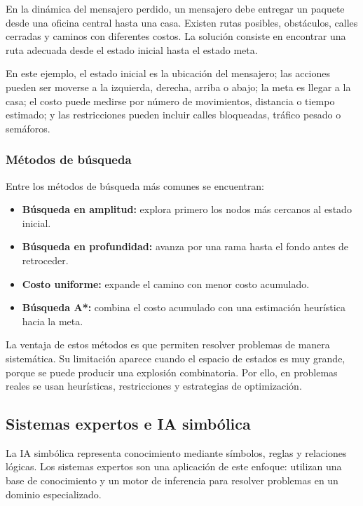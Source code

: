 En la dinámica del mensajero perdido, un mensajero debe entregar un paquete desde una oficina central hasta una casa. Existen rutas posibles, obstáculos, calles cerradas y caminos con diferentes costos. La solución consiste en encontrar una ruta adecuada desde el estado inicial hasta el estado meta.

En este ejemplo, el estado inicial es la ubicación del mensajero; las acciones pueden ser moverse a la izquierda, derecha, arriba o abajo; la meta es llegar a la casa; el costo puede medirse por número de movimientos, distancia o tiempo estimado; y las restricciones pueden incluir calles bloqueadas, tráfico pesado o semáforos.

\subsubsection{Métodos de búsqueda}

Entre los métodos de búsqueda más comunes se encuentran:

\begin{itemize}
    \item \textbf{Búsqueda en amplitud:} explora primero los nodos más cercanos al estado inicial.
    \item \textbf{Búsqueda en profundidad:} avanza por una rama hasta el fondo antes de retroceder.
    \item \textbf{Costo uniforme:} expande el camino con menor costo acumulado.
    \item \textbf{Búsqueda A*:} combina el costo acumulado con una estimación heurística hacia la meta.
\end{itemize}

La ventaja de estos métodos es que permiten resolver problemas de manera sistemática. Su limitación aparece cuando el espacio de estados es muy grande, porque se puede producir una explosión combinatoria. Por ello, en problemas reales se usan heurísticas, restricciones y estrategias de optimización.

\subsection{Sistemas expertos e IA simbólica}

La IA simbólica representa conocimiento mediante símbolos, reglas y relaciones lógicas. Los sistemas expertos son una aplicación de este enfoque: utilizan una base de conocimiento y un motor de inferencia para resolver problemas en un dominio especializado.


